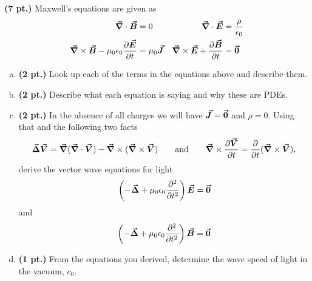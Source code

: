 \documentclass[12pt]{article} %
\newcommand{\vecfieldB}{\boldsymbol{\vec{B}}}
\newcommand{\vecfieldJ}{\boldsymbol{\vec{J}}}
\newcommand{\veclaplace}{\boldsymbol{\vec{\Delta}}}
\begin{document}
\newpage
\begin{problem}
\textbf{(7 pt.)} Maxwell's equations are given as
\begin{align*}
\grad \cdot \vecfieldB &= 0  & \grad \cdot \vecfieldE &= \frac{\rho}{\epsilon_0}\\
\grad \times \vecfieldB -\mu_0 \epsilon_0\frac{\partial \vecfieldE}{\partial t}&=\mu_0 \vecfieldJ & \grad \times \vecfieldE + \frac{\partial \vecfieldB}{\partial t} &= \zerovec
\end{align*}
\begin{enumerate}[(a)]
    \item \textbf{(2 pt.)} Look up each of the terms in the equations above and describe them.
    \item \textbf{(2 pt.)} Describe what each equation is saying and why these are PDEs.
    \item \textbf{(2 pt.)} In the absence of all charges we will have $\vecfieldJ=\zerovec$ and $\rho=0$.  Using that and the following two facts
    \[
    \veclaplace \vecfieldV = \grad (\grad \cdot \vecfieldV) - \grad \times (\grad \times \vecfieldV) \qquad \textrm{and} \qquad \grad \times \frac{\partial \vecfieldV}{\partial t} = \frac{\partial}{\partial t} (\grad \times \vecfieldV),
    \]
    derive the vector wave equations for light
    \[
    \left( - \veclaplace + \mu_0 \epsilon_0 \frac{\partial^2 }{\partial t^2}\right) \vecfieldE = \zerovec
    \]
    and
    \[
    \left( - \veclaplace + \mu_0 \epsilon_0 \frac{\partial^2 }{\partial t^2}\right) \vecfieldB = \zerovec
    \]
    \item \textbf{(1 pt.)} From the equations you derived, determine the wave speed of light in the vacuum, $c_0$.
\end{enumerate}
\end{problem}
\end{document}
